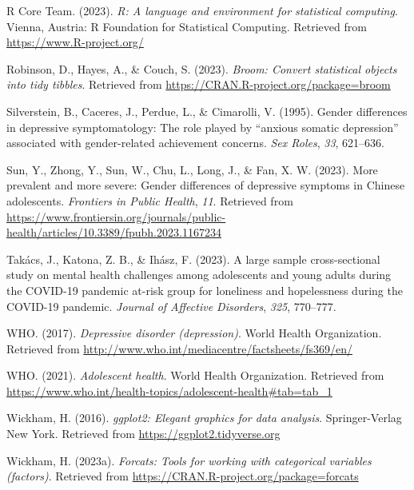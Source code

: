 \documentclass[
  man,floatsintext]{apa6}
\newlength{\cslhangindent}
\newlength{\cslentryspacingunit} %
\newenvironment{CSLReferences}[2] %
 {%
  \setlength{\parindent}{0pt}
  \ifodd #1
  \let\oldpar\par
  \def\par{\hangindent=\cslhangindent\oldpar}
  \fi
  \setlength{\parskip}{#2\cslentryspacingunit}
 }%
 {}
\begin{document}
\begin{CSLReferences}{1}{0}
\leavevmode{}%
R Core Team. (2023). \emph{R: A language and environment for statistical computing}. Vienna, Austria: R Foundation for Statistical Computing. Retrieved from \url{https://www.R-project.org/}

\leavevmode{}%
Robinson, D., Hayes, A., \& Couch, S. (2023). \emph{Broom: Convert statistical objects into tidy tibbles}. Retrieved from \url{https://CRAN.R-project.org/package=broom}

\leavevmode{}%
Silverstein, B., Caceres, J., Perdue, L., \& Cimarolli, V. (1995). Gender differences in depressive symptomatology: The role played by {``anxious somatic depression''} associated with gender-related achievement concerns. \emph{Sex Roles}, \emph{33}, 621--636.

\leavevmode{}%
Sun, Y., Zhong, Y., Sun, W., Chu, L., Long, J., \& Fan, X. W. (2023). More prevalent and more severe: Gender differences of depressive symptoms in {Chinese} adolescents. \emph{Frontiers in Public Health}, \emph{11}. Retrieved from \url{https://www.frontiersin.org/journals/public-health/articles/10.3389/fpubh.2023.1167234}

\leavevmode{}%
Takács, J., Katona, Z. B., \& Ihász, F. (2023). A large sample cross-sectional study on mental health challenges among adolescents and young adults during the COVID-19 pandemic at-risk group for loneliness and hopelessness during the COVID-19 pandemic. \emph{Journal of Affective Disorders}, \emph{325}, 770--777.

\leavevmode{}%
WHO. (2017). \emph{Depressive disorder (depression)}. World Health Organization. Retrieved from \url{http://www.who.int/mediacentre/factsheets/fs369/en/}

\leavevmode{}%
WHO. (2021). \emph{Adolescent health}. World Health Organization. Retrieved from \url{https://www.who.int/health-topics/adolescent-health\#tab=tab_1}

\leavevmode{}%
Wickham, H. (2016). \emph{ggplot2: Elegant graphics for data analysis}. Springer-Verlag New York. Retrieved from \url{https://ggplot2.tidyverse.org}

\leavevmode{}%
Wickham, H. (2023a). \emph{Forcats: Tools for working with categorical variables (factors)}. Retrieved from \url{https://CRAN.R-project.org/package=forcats}


\end{CSLReferences}
\end{document}
